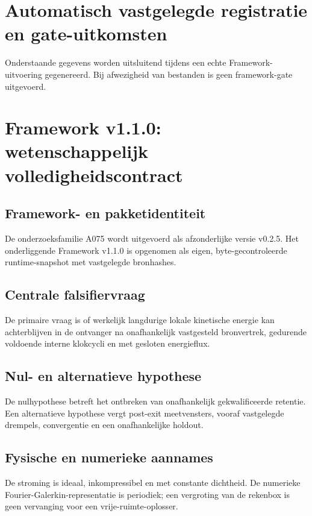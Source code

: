\documentclass[10pt,a4paper]{article}
\begin{document}
\section{Automatisch vastgelegde registratie en gate-uitkomsten}
Onderstaande gegevens worden uitsluitend tijdens een echte Framework-uitvoering gegenereerd.
Bij afwezigheid van bestanden is geen framework-gate uitgevoerd.

\section{Framework v1.1.0: wetenschappelijk volledigheidscontract}
\subsection{Framework- en pakketidentiteit}
De onderzoeksfamilie A075 wordt uitgevoerd als afzonderlijke versie v0.2.5. Het onderliggende Framework v1.1.0 is opgenomen als eigen, byte-gecontroleerde runtime-snapshot met vastgelegde bronhashes.
\subsection{Centrale falsifiervraag}
De primaire vraag is of werkelijk langdurige lokale kinetische energie kan achterblijven in de ontvanger na onafhankelijk vastgesteld bronvertrek, gedurende voldoende interne klokcycli en met gesloten energieflux.
\subsection{Nul- en alternatieve hypothese}
De nulhypothese betreft het ontbreken van onafhankelijk gekwalificeerde retentie. Een alternatieve hypothese vergt post-exit meetvensters, vooraf vastgelegde drempels, convergentie en een onafhankelijke holdout.
\subsection{Fysische en numerieke aannames}
De stroming is ideaal, inkompressibel en met constante dichtheid. De numerieke Fourier-Galerkin-representatie is periodiek; een vergroting van de rekenbox is geen vervanging voor een vrije-ruimte-oplosser.
\end{document}
